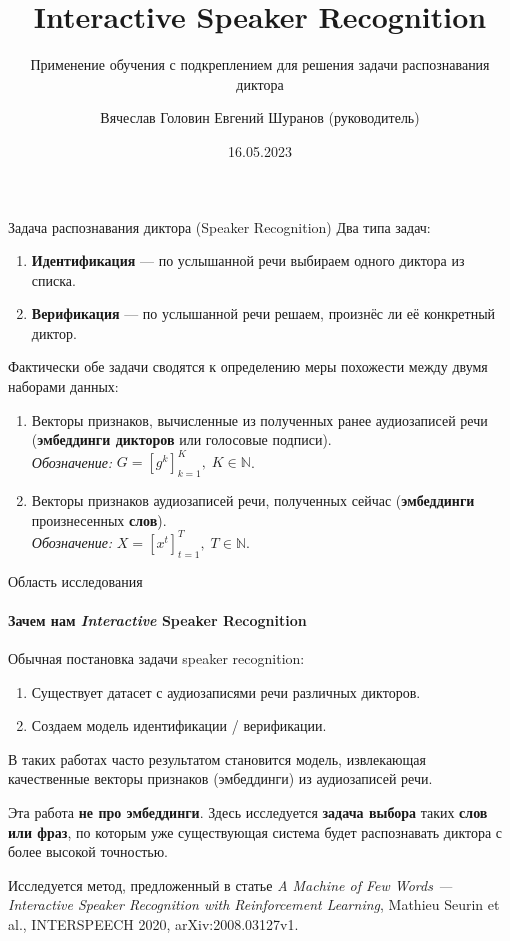 \documentclass[aspectratio=43]{beamer}
\title{Interactive Speaker Recognition}
\subtitle{Применение обучения с подкреплением для решения задачи распознавания
          диктора}
\author[В.С.~Головин]{Вячеслав Головин \texorpdfstring{\newline}{, }
    {\small Евгений Шуранов (руководитель)}}
\institute[ВШЭ]{Huawei CBG AI и ФКН ВШЭ СПб}
\date{16.05.2023}
\begin{document}
\frame{\titlepage}

\begin{frame}{Задача распознавания диктора (Speaker Recognition)}
    Два типа задач:
    \begin{enumerate}
        \item \textbf{Идентификация} --- по услышанной речи выбираем одного диктора из списка.
        \item \textbf{Верификация} --- по услышанной речи решаем, произнёс ли её конкретный диктор.
    \end{enumerate}\vspace{1em}

    Фактически обе задачи сводятся к определению меры похожести между двумя
    наборами данных:
    \begin{enumerate}
        \item Векторы признаков, вычисленные из полученных ранее аудиозаписей речи
        (\textbf{эмбеддинги дикторов} или голосовые подписи).\\
        \textit{Обозначение:} $G = {[g^k]}_{k=1}^K, \; K \in \mathbb{N}$.
        \item Векторы признаков аудиозаписей речи, полученных сейчас
        (\textbf{эмбеддинги} произнесенных \textbf{слов}).\\
        \textit{Обозначение:} $X = {[x^t]}_{t=1}^T, \; T \in \mathbb{N}$.
    \end{enumerate}
\end{frame}

\begin{frame}{Область исследования}
    \framesubtitle{Зачем нам \emph{Interactive} Speaker Recognition}
    Обычная постановка задачи speaker recognition:
    \begin{enumerate}
        \item Существует датасет с аудиозаписями речи различных дикторов.
        \item Создаем модель идентификации / верификации.
    \end{enumerate}
    В таких работах часто результатом становится модель, извлекающая
    качественные векторы признаков (эмбеддинги) из аудиозаписей речи.
    \vspace{1em}

    Эта работа \textbf{не про эмбеддинги}. Здесь исследуется \textbf{задача
    выбора} таких \textbf{слов или фраз}, по которым уже существующая система
    будет распознавать диктора с более высокой точностью.\vspace{1em}

    Исследуется метод, предложенный в статье \textit{A Machine of Few Words --- Interactive
    Speaker Recognition with Reinforcement Learning}, Mathieu Seurin et al.,
    INTERSPEECH 2020, arXiv:2008.03127v1.
\end{frame}
\end{document}
